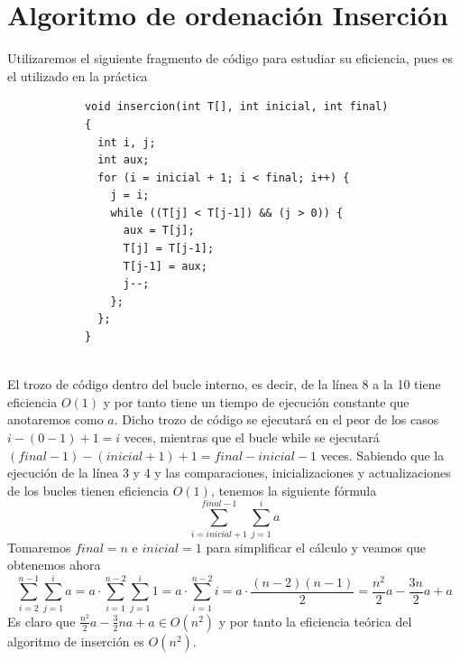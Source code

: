 \documentclass[11pt,openany]{book}
\begin{document}
        \section*{Algoritmo de ordenación Inserción}
        Utilizaremos el siguiente fragmento de código para estudiar su eficiencia, pues es el utilizado en la práctica
        \begin{lstlisting}
            void insercion(int T[], int inicial, int final)
            {
              int i, j;
              int aux;
              for (i = inicial + 1; i < final; i++) {
                j = i;
                while ((T[j] < T[j-1]) && (j > 0)) {
                  aux = T[j];
                  T[j] = T[j-1];
                  T[j-1] = aux;
                  j--;
                };
              };
            }
            
        \end{lstlisting}
        El trozo de código dentro del bucle interno, es decir, de la línea 8 a la 10 tiene eficiencia $O(1)$ y por tanto
        tiene un tiempo de ejecución constante que anotaremos como $a$. Dicho trozo de código se ejecutará en el peor de los casos
        $i-(0-1)+1=i$ veces, mientras que el bucle while se ejecutará $(final-1)-(inicial+1)+1=final-inicial-1$ veces.
        Sabiendo que la ejecución de la línea 3 y 4 y las comparaciones, inicializaciones y actualizaciones de los bucles tienen eficiencia $O(1)$, 
        tenemos la siguiente fórmula
        \begin{equation*}
            \sum_{i=inicial+1}^{final-1} \sum_{j=1}^{i}a
        \end{equation*}
        Tomaremos $final =  n$ e $inicial = 1$ para simplificar el cálculo y veamos que obtenemos ahora
        \begin{equation*}
            \sum_{i=2}^{n-1} \sum_{j=1}^{i}a= a \cdot \sum_{i=1}^{n-2} \sum_{j=1}^{i}1= a \cdot \sum_{i=1}^{n-2} i
            = a \cdot \frac{(n-2)(n-1)}{2}=\frac{n^2}{2}a-\frac{3n}{2}a+a 
        \end{equation*}
        Es claro que $\frac{n^2}{2}a-\frac{3}{2}na+a \in O(n^2)$ y por tanto la eficiencia teórica del algoritmo de inserción es $O(n^2)$.
        
\end{document}
